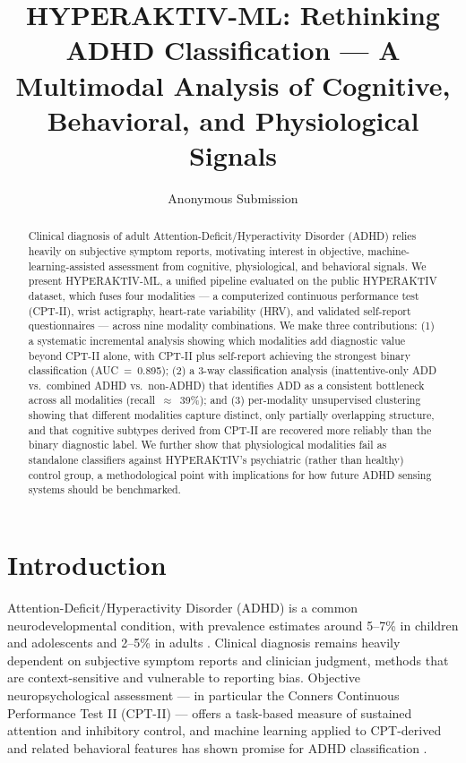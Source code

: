 \documentclass[11pt]{article}
\title{HYPERAKTIV-ML: Rethinking ADHD Classification --- A Multimodal Analysis of Cognitive, Behavioral, and Physiological Signals}
\author{Anonymous Submission}
\begin{document}
\maketitle

\begin{abstract}
Clinical diagnosis of adult Attention-Deficit/Hyperactivity Disorder (ADHD) relies heavily on subjective symptom reports, motivating interest in objective, machine-learning-assisted assessment from cognitive, physiological, and behavioral signals. We present HYPERAKTIV-ML, a unified pipeline evaluated on the public HYPERAKTIV dataset, which fuses four modalities --- a computerized continuous performance test (CPT-II), wrist actigraphy, heart-rate variability (HRV), and validated self-report questionnaires --- across nine modality combinations. We make three contributions: (1) a systematic incremental analysis showing which modalities add diagnostic value beyond CPT-II alone, with CPT-II plus self-report achieving the strongest binary classification (AUC~=~0.895); (2) a 3-way classification analysis (inattentive-only ADD vs.\ combined ADHD vs.\ non-ADHD) that identifies ADD as a consistent bottleneck across all modalities (recall~$\approx$~39\%); and (3) per-modality unsupervised clustering showing that different modalities capture distinct, only partially overlapping structure, and that cognitive subtypes derived from CPT-II are recovered more reliably than the binary diagnostic label. We further show that physiological modalities fail as standalone classifiers against HYPERAKTIV's psychiatric (rather than healthy) control group, a methodological point with implications for how future ADHD sensing systems should be benchmarked.
\end{abstract}

\section{Introduction}

Attention-Deficit/Hyperactivity Disorder (ADHD) is a common neurodevelopmental condition, with prevalence estimates around 5--7\% in children and adolescents and 2--5\% in adults \citep{tivadar2025critical}. Clinical diagnosis remains heavily dependent on subjective symptom reports and clinician judgment, methods that are context-sensitive and vulnerable to reporting bias. Objective neuropsychological assessment --- in particular the Conners Continuous Performance Test II (CPT-II) --- offers a task-based measure of sustained attention and inhibitory control, and machine learning applied to CPT-derived and related behavioral features has shown promise for ADHD classification \citep{casals2025machine}.
\end{document}
